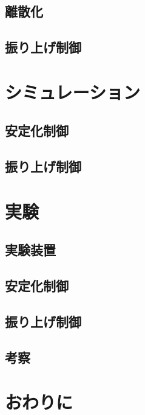 \documentclass[a4j,11pt,twoside]{ujbook}
\begin{document}
\section{離散化}
\section{振り上げ制御}	

\chapter{シミュレーション}
\section{安定化制御}
\section{振り上げ制御}

\chapter{実験}
\section{実験装置}
\section{安定化制御}
\section{振り上げ制御}
\section{考察}

\chapter{おわりに}
\end{document}
